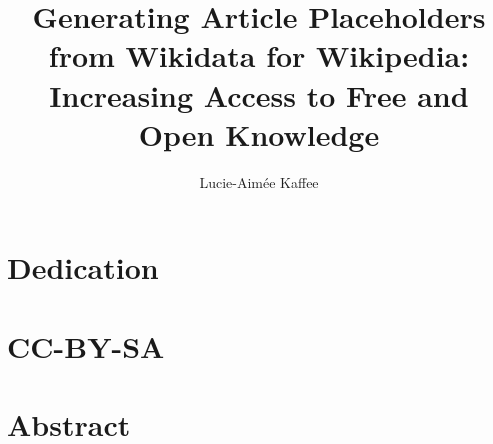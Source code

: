 \documentclass[11pt]{report} %
\title{Generating Article Placeholders from Wikidata for Wikipedia:\\Increasing Access to Free and Open Knowledge}
\author{Lucie-Aim\'{e}e Kaffee}
\date{}
\begin{document}
\maketitle
\newpage

\chapter*{Dedication}

\chapter*{CC-BY-SA}
\chapter*{Abstract}
\newpage

\tableofcontents




\newpage

\newpage






\end{document}
